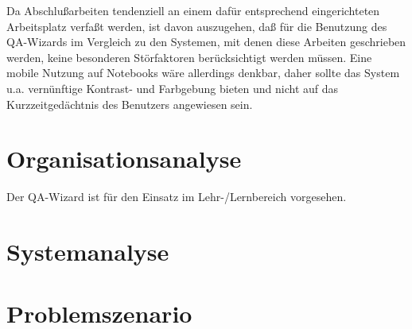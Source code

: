 \documentclass[11pt,        %
  english,ngerman,          %
  paper=a4,                 %
  captions=tablesignature,  %
  listof=numbered,          %
  bibliography=totoc,       %
  headings=small,           %
  headinclude=false,        %
  footinclude=false,        %
  parskip=half-,            %
  oneside,                  %
  BCOR=15mm,                 %
  DIV=12                    %
  ]{scrbook}                %
\begin{document}
Da Abschlußarbeiten tendenziell an einem dafür entsprechend eingerichteten Arbeitsplatz verfaßt werden, ist davon auszugehen, daß für die Benutzung des QA-Wizards im Vergleich zu den Systemen, mit denen diese Arbeiten geschrieben werden, keine besonderen Störfaktoren berücksichtigt werden müssen. Eine mobile Nutzung auf Notebooks wäre allerdings denkbar, daher sollte das System u.a. vernünftige Kontrast- und Farbgebung bieten und nicht auf das Kurzzeitgedächtnis des Benutzers angewiesen sein.

\section{Organisationsanalyse}\label{sec:orga_ana}


Der QA-Wizard ist für den Einsatz im Lehr-/Lernbereich vorgesehen.

\section{Systemanalyse}\label{sec:sys_ana}


\section{Problemszenario}\label{sec:problem_sce}

\end{document}
